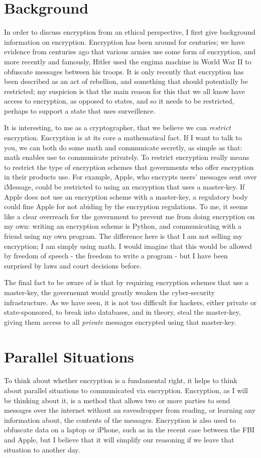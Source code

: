 \documentclass[11pt]{article}
\begin{document}
\section{Background}
In order to discuss encryption from an ethical perspective, I first give background information on encryption.
Encryption has been around for centuries; we have evidence from centuries ago that various armies use some form of encryption, and more recently and famously, Hitler used the engima machine in World War II to obfuscate messages between his troops.
It is only recently that encryption has been described as an act of rebellion, and something that should potentially be restricted; my suspicion is that the main reason for this that we all know have access to encryption, as opposed to states, and so it needs to be restricted, perhaps to support a state that uses surveillence.

It is interesting, to me as a cryptographer, that we believe we can \textit{restrict} encryption.
Encryption is at its core a mathematical fact.
If I want to talk to you, we can both do some math and communicate secretly, as simple as that: math enables use to communicate privately.
To restrict encryption really means to restrict the type of encryption schemes that governments who offer encryption in their products use.
For example, Apple, who encrypts users' messages sent over iMessage, could be restricted to using an encryption that uses a master-key.
If Apple does not use an encryption scheme with a master-key, a regulatory body could fine Apple for not abiding by the encryption regulations.
To me, it seems like a clear overreach for the government to prevent me from doing encryption on my own: writing an encryption scheme is Python, and communicating with a friend using my own program.
The difference here is that I am not selling my encryption; I am simply using math.
I would imagine that this would be allowed by freedom of speech - the freedom to write a program - but I have been surprised by laws and court decisions before.

The final fact to be aware of is that by requiring encryption schemes that use a master-key, the governemnt would greatly weaken the cyber-security infrastructure.
As we have seen, it is not too difficult for hackers, either private or state-sponsored, to break into databases, and in theory, steal the master-key, giving them access to all \textit{private} messages encrypted using that master-key.

\section{Parallel Situations}
To think about whether encryption is a fundamental right, it helps to think about parallel situations to communicated via encryption.
Encryption, as I will be thinking about it, is a method that allows two or more parties to send messages over the internet without an eavesdropper from reading, or learning any information about, the contents of the messages.
Encryption is also used to obfuscate data on a laptop or iPhone, such as in the recent case between the FBI and Apple, but I believe that it will simplify our reasoning if we leave that situation to another day.
\end{document}
